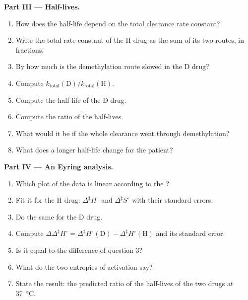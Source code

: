 \begin{problem}
\medskip\noindent\textbf{Part III --- Half-lives.}
\begin{enumerate}[resume]
  \item How does the half-life depend on the total clearance rate constant?
  \item Write the total rate constant of the H drug as the sum of its two
        routes, in fractions.
  \item By how much is the demethylation route slowed in the D drug?
  \item Compute $k_{\mathrm{total}}(\mathrm D)/k_{\mathrm{total}}(\mathrm H)$.
  \item Compute the half-life of the D drug.
  \item Compute the ratio of the half-lives.
  \item What would it be if the whole clearance went through demethylation?
  \item What does a longer half-life change for the patient?
\end{enumerate}

\medskip\noindent\textbf{Part IV --- An Eyring analysis.}
\begin{enumerate}[resume]
  \item Which plot of the data is linear according to the ?
  \item Fit it for the H drug: $\Delta^{\ddagger}H^\circ$ and $\Delta^{\ddagger}S^\circ$ with their standard errors.
  \item Do the same for the D drug.
  \item Compute $\Delta\Delta^{\ddagger}H^\circ = \Delta^{\ddagger}H^\circ(\mathrm D) - \Delta^{\ddagger}H^\circ(\mathrm H)$ and its standard error.
  \item Is it equal to the  difference of question 3?
  \item What do the two entropies of activation say?
  \item State the result: the predicted ratio of the half-lives of the two drugs
        at \qty{37}{\celsius}.
\end{enumerate}
\end{problem}
